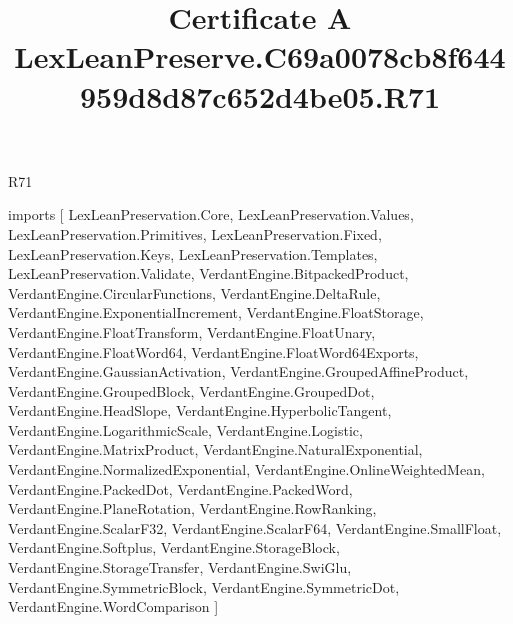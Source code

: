 \begin{lexlean}{R71}
\title{Certificate A LexLeanPreserve.C69a0078cb8f644959d8d87c652d4be05.R71}
\begin{coremodule}
imports [
  LexLeanPreservation.Core,
  LexLeanPreservation.Values,
  LexLeanPreservation.Primitives,
  LexLeanPreservation.Fixed,
  LexLeanPreservation.Keys,
  LexLeanPreservation.Templates,
  LexLeanPreservation.Validate,
  VerdantEngine.BitpackedProduct,
  VerdantEngine.CircularFunctions,
  VerdantEngine.DeltaRule,
  VerdantEngine.ExponentialIncrement,
  VerdantEngine.FloatStorage,
  VerdantEngine.FloatTransform,
  VerdantEngine.FloatUnary,
  VerdantEngine.FloatWord64,
  VerdantEngine.FloatWord64Exports,
  VerdantEngine.GaussianActivation,
  VerdantEngine.GroupedAffineProduct,
  VerdantEngine.GroupedBlock,
  VerdantEngine.GroupedDot,
  VerdantEngine.HeadSlope,
  VerdantEngine.HyperbolicTangent,
  VerdantEngine.LogarithmicScale,
  VerdantEngine.Logistic,
  VerdantEngine.MatrixProduct,
  VerdantEngine.NaturalExponential,
  VerdantEngine.NormalizedExponential,
  VerdantEngine.OnlineWeightedMean,
  VerdantEngine.PackedDot,
  VerdantEngine.PackedWord,
  VerdantEngine.PlaneRotation,
  VerdantEngine.RowRanking,
  VerdantEngine.ScalarF32,
  VerdantEngine.ScalarF64,
  VerdantEngine.SmallFloat,
  VerdantEngine.Softplus,
  VerdantEngine.StorageBlock,
  VerdantEngine.StorageTransfer,
  VerdantEngine.SwiGlu,
  VerdantEngine.SymmetricBlock,
  VerdantEngine.SymmetricDot,
  VerdantEngine.WordComparison
]


\end{coremodule}
\end{lexlean}
